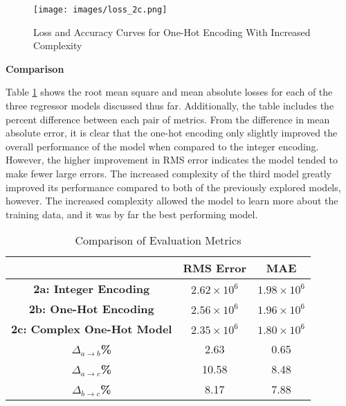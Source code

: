 \documentclass{article}
\begin{document}
\begin{enumerate}[label=1\alph*. ]
    \begin{figure}[h]
        \centering
        \texttt{[image: images/loss\_2c.png]}
        \caption{Loss and Accuracy Curves for One-Hot Encoding With Increased Complexity}
        \label{fig:loss_2c}
    \end{figure}

    \newpage
    \textbf{Comparison}

    Table \ref{tab:comparison2} shows the root mean square and mean absolute
    losses for each of the three regressor models discussed thus far.
    Additionally, the table includes the percent difference between each pair of
    metrics. From the difference in mean absolute error, it is clear that the one-hot encoding only slightly
    improved the overall performance of the model when compared to the integer encoding. However, the higher
    improvement in RMS error indicates the model tended to make fewer large
    errors. The increased complexity of the third model greatly improved its
    performance compared to both of the previously explored models, however. The
    increased complexity allowed the model to learn more about the training
    data, and it was by far the best performing model.

    \begin{table}[h]
        \centering
        \begin{tabular}{|c|c|c|}
            \hline
             & \textbf{RMS Error} & \textbf{MAE} \\
            \hline
            \textbf{2a: Integer Encoding} & $2.62 \times 10^{6}$ & $1.98 \times 10^{6}$  \\
            \hline
            \textbf{2b: One-Hot Encoding} & $2.56 \times 10^{6}$ & $1.96 \times 10^{6}$\\
            \hline
            \textbf{2c: Complex One-Hot Model} & $2.35 \times 10^{6}$ & $1.80 \times 10^{6}$\\
            \hline
            \textbf{\large $\Delta_{a \rightarrow b}$\%} & 2.63 & 0.65 \\
            \hline
            \textbf{\large $\Delta_{a \rightarrow c}$\%} & 10.58 & 8.48 \\
            \hline
            \textbf{\large $\Delta_{b \rightarrow c}$\%} & 8.17 & 7.88 \\
            \hline
        \end{tabular}
        \caption{Comparison of Evaluation Metrics}
        \label{tab:comparison2}
    \end{table}



\end{enumerate}
\end{document}
